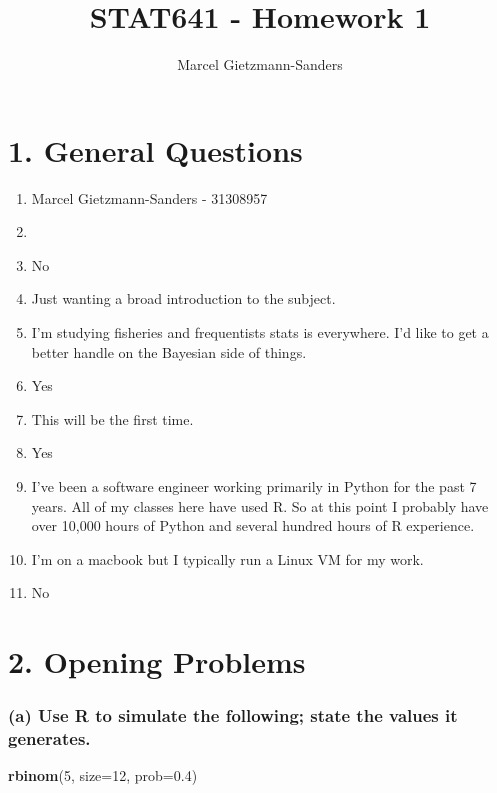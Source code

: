 \documentclass[
]{article}
\title{STAT641 - Homework 1}
\author{Marcel Gietzmann-Sanders}
\date{}
\newenvironment{Shaded}{\begin{snugshade}}{\end{snugshade}}
\newcommand{\DataTypeTok}[1]{\textcolor[rgb]{0.13,0.29,0.53}{#1}}
\newcommand{\DecValTok}[1]{\textcolor[rgb]{0.00,0.00,0.81}{#1}}
\newcommand{\FloatTok}[1]{\textcolor[rgb]{0.00,0.00,0.81}{#1}}
\newcommand{\KeywordTok}[1]{\textcolor[rgb]{0.13,0.29,0.53}{\textbf{#1}}}
\newcommand{\NormalTok}[1]{#1}
\providecommand{\tightlist}{%
  \setlength{\itemsep}{0pt}\setlength{\parskip}{0pt}}
\begin{document}
\maketitle

\hypertarget{general-questions}{%
\section{1. General Questions}\label{general-questions}}

\begin{enumerate}
\def\labelenumi{\alph{enumi}.}
\tightlist
\item
  Marcel Gietzmann-Sanders - 31308957
\item
\item
  No
\item
  Just wanting a broad introduction to the subject.
\item
  I'm studying fisheries and frequentists stats is everywhere. I'd like
  to get a better handle on the Bayesian side of things.
\item
  Yes
\item
  This will be the first time.
\item
  Yes
\item
  I've been a software engineer working primarily in Python for the past
  7 years. All of my classes here have used R. So at this point I
  probably have over 10,000 hours of Python and several hundred hours of
  R experience.
\item
  I'm on a macbook but I typically run a Linux VM for my work.
\item
  No
\end{enumerate}

\hypertarget{opening-problems}{%
\section{2. Opening Problems}\label{opening-problems}}

\hypertarget{a-use-r-to-simulate-the-following-state-the-values-it-generates.}{%
\subsubsection{(a) Use R to simulate the following; state the values it
generates.}\label{a-use-r-to-simulate-the-following-state-the-values-it-generates.}}

\begin{Shaded}
\begin{Highlighting}[]
\KeywordTok{rbinom}\NormalTok{(}\DecValTok{5}\NormalTok{, }\DataTypeTok{size=}\DecValTok{12}\NormalTok{, }\DataTypeTok{prob=}\FloatTok{0.4}\NormalTok{)}
\end{Highlighting}
\end{Shaded}
\end{document}
